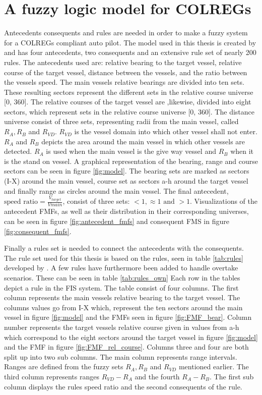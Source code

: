 \section{A fuzzy logic model for COLREGs}
\label{section:model}
Antecedents consequents and rules are needed in order to make a fuzzy system for a COLREGs compliant auto pilot. The model used in this thesis is created by \textcite{perera2012intelligent} and has four antecedents, two consequents and an extensive rule set of nearly 200 rules. The antecedents used are: relative bearing to the target vessel, relative course of the target vessel, distance between the vessels, and the ratio between the vessels speed. The main vessels relative bearings are divided into ten sets. These resulting sectors represent the different sets in the relative course universe [0, 360]. The relative courses of the target vessel are ,likewise, divided into eight sectors, which represent sets in the relative course universe [0, 360]. The distance universe consist of three sets, representing radii from the main vessel, called $R_A, R_B$ and $R_{VD}$. $R_{VD}$ is the vessel domain into which other vessel shall not enter. $R_A$ and $R_B$ depicts the area around the main vessel in which other vessels are detected. $R_A$ is used when the main vessel is the give way vessel and $R_B$ when it is the stand on vessel. A graphical representation of the bearing, range and course sectors can be seen in figure \ref{fig:model}. The bearing sets are marked as sectors (I-X) around the main vessel, course set as sectors a-h around the target vessel and finally range as circles around the main vessel. The final antecedent, $\text{speed ratio} =\frac{V_{target}}{V{main}}$, consist of three sets: $<1, \approx1 \text{ and } >1$.
Visualizations of the antecedent FMFs, as well as their distribution in their corresponding universes, can be seen in figure \ref{fig:antecedent_fmfs} and consequent FMS in figure \ref{fig:consequent_fmfs}.

Finally a rules set is needed to connect the antecedents with the consequents. The rule set used for this thesis is based on the rules, seen in table \ref{tab:rules} developed by \textcite{perera2012intelligent}. A few rules have furthermore been added to handle overtake scenarios. These can be seen in table \ref{tab:rules_own}
Each row in the tables depict a rule in the FIS system.
The table consist of four columns. The first column represents the main vessels relative bearing to the target vessel. The columns values go from I-X which, represent the ten sectors around the main vessel in figure \ref{fig:model} and the FMFs seen in figure \ref{fig:FMF_bear}. Column number represents the target vessels relative course given in values from a-h which correspond to the eight sectors around the target vessel in figure \ref{fig:model} and the FMF in figure \ref{fig:FMF_rel_course}. Columns three and four are both split up into two sub columns. The main column represents range intervals. Ranges are defined from the fuzzy sets $R_A, R_B$ and $R_{VD}$ mentioned earlier. The third column represents ranges $R_{VD}- R_A$ and the fourth $R_A-R_B$. The first sub column displays the rules speed ratio and the second consequents of the rule.

